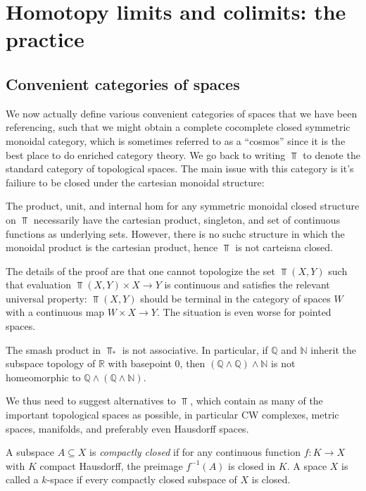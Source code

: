 \chapter{Homotopy limits and colimits: the practice}

\section{Convenient categories of spaces}

We now actually define various convenient categories of spaces that we have been referencing, such that we might obtain a complete cocomplete closed symmetric monoidal category, which is sometimes referred to as a ``cosmos'' since it is the best place to do enriched category theory. We go back to writing $\Top $ to denote the standard category of topological spaces. The main issue with this category is it's failiure to be closed under the cartesian monoidal structure:
\begin{theorem}\label{thm:6.1}
	The product, unit, and internal hom for any symmetric monoidal closed structure on $\Top $ necessarily have the cartesian product, singleton, and set of continuous functions as underlying sets. However, there is no suchc structure in which the monoidal product is the cartesian product, hence $\Top $ is not carteisna closed.
\end{theorem}

The details of the proof are that one cannot topologize the set $\Top (X,Y)$ such that evaluation $\Top (X,Y)\times X\to Y$ is continuous and satisfies the relevant universal property: $\Top (X,Y)$ should be terminal in the category of spaces $W$ with a continuous map $W\times X\to Y$. The situation is even worse for pointed spaces.

\begin{lemma}\label{lma:6.1}
	The smash product in $\Top _*$ is not associative. In particular, if $\mathbb{Q} $ and $\mathbb{N} $ inherit the subspace topology of $\mathbb{R} $ with basepoint 0, then $(\mathbb{Q} \wedge\mathbb{Q} )\wedge\mathbb{N} $ is not homeomorphic to $\mathbb{Q} \wedge (\mathbb{Q} \wedge\mathbb{N} )$.
\end{lemma}

We thus need to suggest alternatives to $\Top $, which contain as many of the important topological spaces as possible, in particular CW complexes, metric spaces, manifolds, and preferably even Hausdorff spaces.

\begin{definition}\label{dfn:6.1}
	A subspace $A\subseteq X$ is \emph{compactly closed} if for any continuous function $f:K\to X$ with $K$ compact Hausdorff, the preimage $f^{-1} (A)$ is closed in $K$. A space $X$ is called a $k$-space if every compactly closed subspace of $X$ is closed.
\end{definition}

